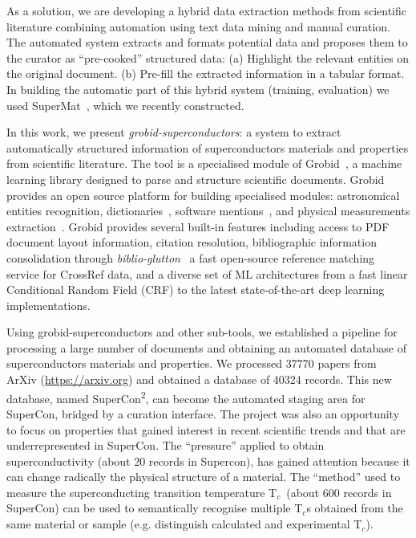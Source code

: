 \documentclass[]{interact}
\theoremstyle{plain}%
\theoremstyle{definition}
\theoremstyle{remark}
\newcommand{\tc}{T$_{c}$}
\begin{document}
As a solution, we are developing a hybrid data extraction methods from scientific literature combining automation using text data mining and manual curation.
The automated system extracts and formats potential data and proposes them to the curator as ``pre-cooked'' structured data: (a) Highlight the relevant entities on the original document.
(b) Pre-fill the extracted information in a tabular format.
In building the automatic part of this hybrid system (training, evaluation) we used SuperMat~\cite{foppiano2021supermat}, which we recently constructed.

In this work, we present \textit{grobid-superconductors}: a system to extract automatically structured information of superconductors materials and properties from scientific literature.
The tool is a specialised module of Grobid~\cite{GROBID}, a machine learning library designed to parse and structure scientific documents.
Grobid provides an open source platform for building specialised modules: astronomical entities recognition\cite{grobid-astro}, dictionaries~\cite{khemakhem:hal-01508868}, software mentions~\cite{lopez2021mining}, and physical measurements extraction~\cite{foppiano2019quantities}.
Grobid provides several built-in features including access to PDF document layout information, citation resolution, bibliographic information consolidation through \textit{biblio-glutton}~\cite{biblio-glutton-lookup} a fast open-source reference matching service for CrossRef data, and a diverse set of ML architectures from a fast linear Conditional Random Field (CRF) to the latest state-of-the-art deep learning implementations.

Using grobid-superconductors and other sub-tools, we established a pipeline for processing a large number of documents and obtaining an automated database of superconductors materials and properties.
We processed 37770 papers from ArXiv (\url{https://arxiv.org}) and obtained a database of 40324 records.
This new database, named SuperCon\textsuperscript{2}, can become the automated staging area for SuperCon, bridged by a curation interface.
The project was also an opportunity to focus on properties that gained interest in recent scientific trends and that are underrepresented in SuperCon.
The ``pressure'' applied to obtain superconductivity (about 20 records in Supercon), has gained attention because it can change radically the physical structure of a material.
The ``method'' used to measure the superconducting transition temperature \tc~(about 600 records in SuperCon) can be used to semantically recognise multiple \tc s obtained from the same material or sample (e.g. distinguish calculated and experimental \tc).
\end{document}
